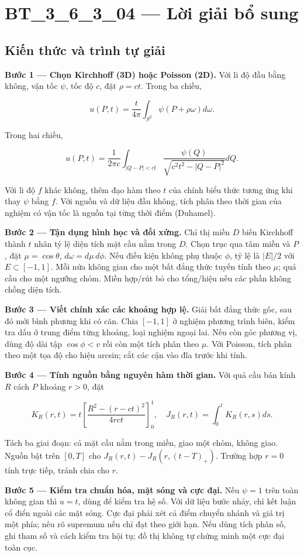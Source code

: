 \documentclass[10pt,a4paper]{article}
\begin{document}
\section*{BT\_3\_6\_3\_04 — Lời giải bổ sung}
\subsection*{Kiến thức và trình tự giải}
\textbf{Bước 1 — Chọn Kirchhoff (3D) hoặc Poisson (2D).} Với li độ đầu bằng không, vận tốc $\psi$, tốc độ $c$, đặt $\rho=ct$. Trong ba chiều,


\[
u(P,t)=\frac t{4\pi}\int_{S^2}\psi(P+\rho\omega)d\omega.
\]


Trong hai chiều,


\[
u(P,t)=\frac1{2\pi c}\int_{|Q-P|<ct}\frac{\psi(Q)}{\sqrt{c^2t^2-|Q-P|^2}}dQ.
\]


Với li độ $f$ khác không, thêm đạo hàm theo $t$ của chính biểu thức tương ứng khi thay $\psi$ bằng $f$. Với nguồn và dữ liệu đầu không, tích phân theo thời gian của nghiệm có vận tốc là nguồn tại từng thời điểm (Duhamel).

\textbf{Bước 2 — Tận dụng hình học và đối xứng.} Chỉ thị miền $D$ biến Kirchhoff thành $t$ nhân tỷ lệ diện tích mặt cầu nằm trong $D$. Chọn trục qua tâm miền và $P$, đặt $\mu=\cos\theta$, $d\omega=d\mu\,d\phi$. Nếu điều kiện không phụ thuộc $\phi$, tỷ lệ là $|E|/2$ với $E\subset[-1,1]$. Mỗi nửa không gian cho một bất đẳng thức tuyến tính theo $\mu$; quả cầu cho một ngưỡng chỏm. Miền hợp/rút bỏ cho tổng/hiệu nếu các phần không chồng diện tích.

\textbf{Bước 3 — Viết chính xác các khoảng hợp lệ.} Giải bất đẳng thức gốc, sau đó mới bình phương khi có căn. Chia $[-1,1]$ ở nghiệm phương trình biên, kiểm tra dấu ở trung điểm từng khoảng, loại nghiệm ngoại lai. Nếu còn góc phương vị, dùng độ dài tập $\cos\phi<v$ rồi còn một tích phân theo $\mu$. Với Poisson, tích phân theo một tọa độ cho hiệu arcsin; cắt các cận vào đĩa trước khi tính.

\textbf{Bước 4 — Tính nguồn bằng nguyên hàm thời gian.} Với quả cầu bán kính $R$ cách $P$ khoảng $r>0$, đặt


\[
K_R(r,t)=t\left[\frac{R^2-(r-ct)^2}{4rct}\right]_0^1,\quad J_R(r,t)=\int_0^tK_R(r,s)ds.
\]


Tách ba giai đoạn: cả mặt cầu nằm trong miền, giao một chỏm, không giao. Nguồn bật trên $[0,T]$ cho $J_R(r,t)-J_R(r,(t-T)_+)$. Trường hợp $r=0$ tính trực tiếp, tránh chia cho $r$.

\textbf{Bước 5 — Kiểm tra chuẩn hóa, mặt sóng và cực đại.} Nếu $\psi=1$ trên toàn không gian thì $u=t$, dùng để kiểm tra hệ số. Với dữ liệu bước nhảy, chỉ kết luận cổ điển ngoài các mặt sóng. Cực đại phải xét cả điểm chuyển nhánh và giá trị một phía; nêu rõ supremum nếu chỉ đạt theo giới hạn. Nếu dùng tích phân số, ghi tham số và cách kiểm tra hội tụ; đồ thị không tự chứng minh một cực đại toàn cục.
\end{document}
